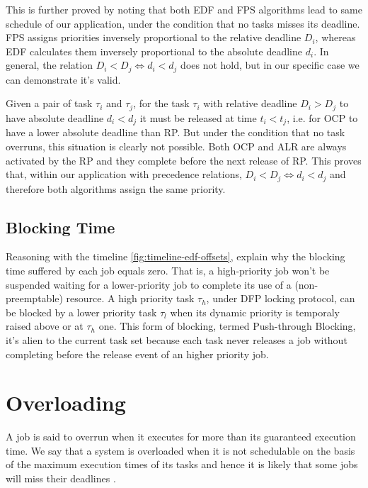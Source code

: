 \documentclass{article}
\begin{document}
This is further proved by noting that both EDF and FPS algorithms lead to same schedule of our application, under the condition that no tasks misses its deadline. FPS assigns priorities inversely proportional to the relative deadline $D_i$, whereas EDF calculates them inversely proportional to the absolute deadline $d_i$. In general, the relation $D_i < D_j \Leftrightarrow d_i < d_j$ does not hold, but in our specific case we can demonstrate it's valid.

Given a pair of task $\tau_i$ and $\tau_j$, for the task $\tau_i$ with relative deadline $D_i > D_j$ to have absolute deadline $d_i < d_j$ it must be released at time $t_i < t_j$, i.e. for OCP to have a lower absolute deadline than RP. But under the condition that no task overruns, this situation is clearly not possible. Both OCP and ALR are always activated by the RP and they complete before the next release of RP. This proves that, within our application with precedence relations, $D_i < D_j \Leftrightarrow d_i < d_j$ and therefore both algorithms assign the same priority.

\subsection{Blocking Time}
Reasoning with the timeline \ref{fig:timeline-edf-offsets}, explain why the blocking time
suffered by each job equals zero.
That is, a high-priority job won't be suspended waiting for a lower-priority job to complete its
use of a (non-preemptable) resource.\newline
A high priority task $\tau_{h}$, under DFP locking protocol, can be blocked by a lower priority task
$\tau_{l}$ when its dynamic priority is temporaly raised above or at $\tau_{h}$ one.
This form of blocking, termed Push-through Blocking, it's alien to the current task set because
each task never releases a job without completing before the release event of
an higher priority job.


\section{Overloading}

A job is said to overrun when it executes for more than its guaranteed execution time. We say that a system is overloaded when it is not schedulable on the basis of the maximum execution times of its tasks and hence it is likely that some jobs will miss their deadlines \cite{liu-overload}.
\end{document}
